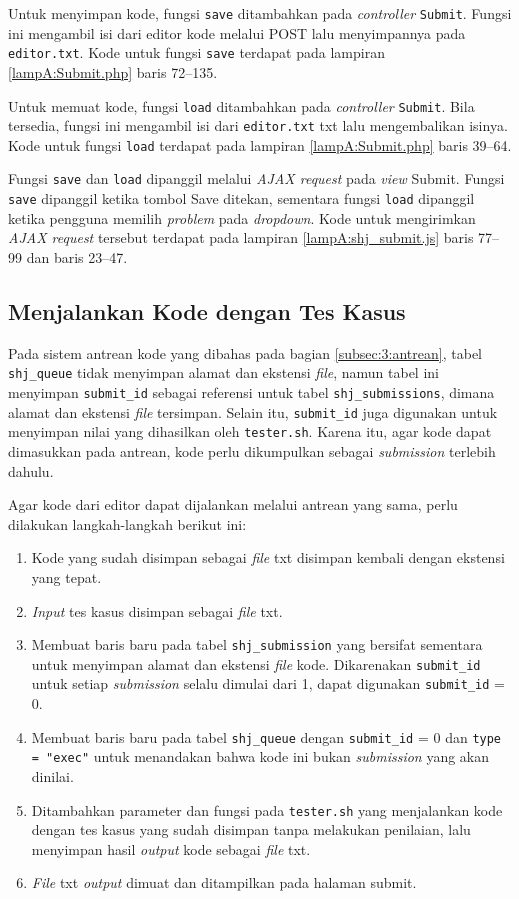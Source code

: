 Untuk menyimpan kode, fungsi \verb|save| ditambahkan pada \textit{controller} \verb|Submit|. Fungsi ini mengambil isi dari editor kode melalui POST lalu menyimpannya pada \verb|editor.txt|. Kode untuk fungsi \verb|save| terdapat pada lampiran \ref{lampA:Submit.php} baris 72--135.

Untuk memuat kode, fungsi \verb|load| ditambahkan pada \textit{controller} \verb|Submit|. Bila tersedia, fungsi ini mengambil isi dari \verb|editor.txt| txt lalu mengembalikan isinya. Kode untuk fungsi \verb|load| terdapat pada lampiran \ref{lampA:Submit.php} baris 39--64.

Fungsi \verb|save| dan \verb|load| dipanggil melalui \textit{AJAX request} pada \textit{view} Submit. Fungsi \verb|save| dipanggil ketika tombol Save ditekan, sementara fungsi \verb|load| dipanggil ketika pengguna memilih \textit{problem} pada \textit{dropdown}. Kode untuk mengirimkan \textit{AJAX request} tersebut terdapat pada lampiran \ref{lampA:shj_submit.js} baris 77--99 dan baris 23--47.

\subsection{Menjalankan Kode dengan Tes Kasus}
\label{sec:5:jalan}

Pada sistem antrean kode yang dibahas pada bagian \ref{subsec:3:antrean}, tabel \verb|shj_queue| tidak menyimpan alamat dan ekstensi \textit{file}, namun tabel ini menyimpan \verb|submit_id| sebagai referensi untuk tabel \verb|shj_submissions|, dimana alamat dan ekstensi \textit{file} tersimpan. Selain itu, \verb|submit_id| juga digunakan untuk menyimpan nilai yang dihasilkan oleh \verb|tester.sh|. Karena itu, agar kode dapat dimasukkan pada antrean, kode perlu dikumpulkan sebagai \textit{submission} terlebih dahulu. 

Agar kode dari editor dapat dijalankan melalui antrean yang sama, perlu dilakukan langkah-langkah berikut ini:
\begin{enumerate}
    \item Kode yang sudah disimpan sebagai \textit{file} txt disimpan kembali dengan ekstensi yang tepat.
    \item \textit{Input} tes kasus disimpan sebagai \textit{file} txt.
    \item Membuat baris baru pada tabel \verb|shj_submission| yang bersifat sementara untuk menyimpan alamat dan ekstensi \textit{file} kode. Dikarenakan \verb|submit_id| untuk setiap \textit{submission} selalu dimulai dari 1, dapat digunakan \verb|submit_id| = 0.
    \item Membuat baris baru pada tabel \verb|shj_queue| dengan \verb|submit_id| = 0 dan \verb|type = "exec"| untuk menandakan bahwa kode ini bukan \textit{submission} yang akan dinilai.
    \item Ditambahkan parameter dan fungsi pada \verb|tester.sh| yang menjalankan kode dengan tes kasus yang sudah disimpan tanpa melakukan penilaian, lalu menyimpan hasil \textit{output} kode sebagai \textit{file} txt.
    \item \textit{File} txt \textit{output} dimuat dan ditampilkan pada halaman submit.
\end{enumerate}

